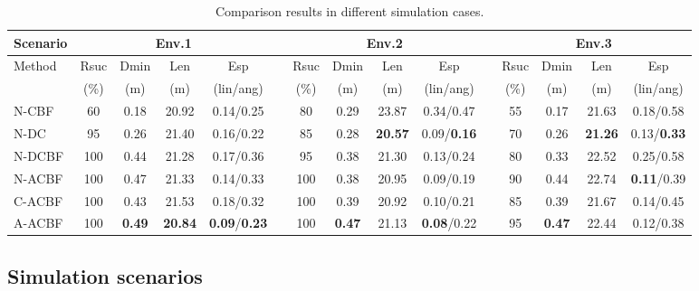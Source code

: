 \documentclass[preprint,5p,times,twocolumn]{elsarticle}
\begin{document}
\begin{table}[htbp]
  \centering
  \fontsize{7.5}{11}\selectfont
  \caption{Comparison results in different simulation cases.}
    \begin{tabular}{lcccccccccccccc}
    \hline
    Scenario & \multicolumn{4}{c}{Env.1}     &       & \multicolumn{4}{c}{Env.2}     &       & \multicolumn{4}{c}{Env.3} \\
    \hline
    \multirow{2}[2]{*}{Method} & Rsuc & Dmin  & Len   & Esp   &       & Rsuc & Dmin  & Len   & Esp   &       & Rsuc & Dmin  & Len   & Esp \\
          & (\%)  & (m)   & (m)   & (lin/ang) &       & (\%)  & (m)   & (m)   & (lin/ang) &       & (\%)  & (m)   & (m)   & (lin/ang) \\
    \hline
    N-CBF  & 60    & 0.18     & 20.92     & 0.14/0.25     &       & 80    & 0.29     & 23.87     & 0.34/0.47     &       & 55    & 0.17     & 21.63     & 0.18/0.58 \\
    N-DC & 95    & 0.26     & 21.40     & 0.16/0.22     &       & 85    & 0.28     & \textbf{20.57}     & 0.09/\textbf{0.16}     &       & 70    & 0.26     & \textbf{21.26}     & 0.13/\textbf{0.33} \\
    N-DCBF & 100    & 0.44     & 21.28     & 0.17/0.36     &       & 95    & 0.38     & 21.30     & 0.13/0.24     &       & 80    & 0.33     & 22.52     & 0.25/0.58 \\
    N-ACBF & 100     & 0.47     & 21.33     & 0.14/0.33    &       & 100    & 0.38     & 20.95     & 0.09/0.19     &       & 90    & 0.44     & 22.74     & \textbf{0.11}/0.39 \\
    C-ACBF & 100     & 0.43     & 21.53     & 0.18/0.32     &       & 100    & 0.39     & 20.92     & 0.10/0.21     &       & 85    & 0.39     & 21.67     & 0.14/0.45 \\
    A-ACBF & 100     & \textbf{0.49}     & \textbf{20.84}     & \textbf{0.09}/\textbf{0.23}    &       & 100    & \textbf{0.47}     & 21.13     & \textbf{0.08}/0.22     &       & 95    & \textbf{0.47}     & 22.44     & 0.12/0.38 \\
    \hline
    \end{tabular}%
  \label{tab:simulation-datas}%
\end{table}%


\subsection{Simulation scenarios}
\label{simulation-section}
\end{document}
